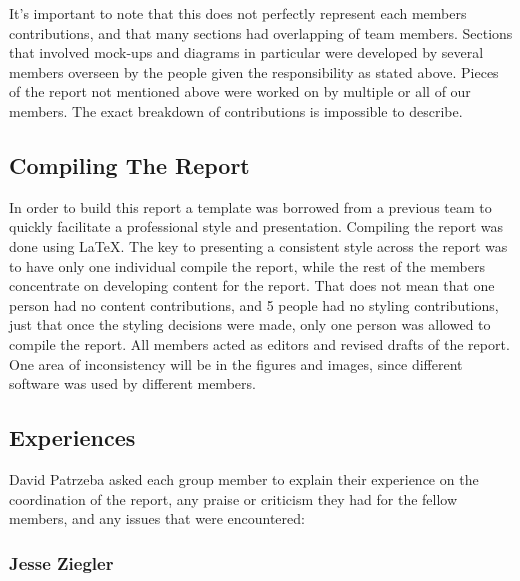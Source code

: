 It's important to note that this does not perfectly represent each members
contributions, and that many sections had overlapping of team members. Sections
that involved mock-ups and diagrams in particular were developed by several
members overseen by the people given the responsibility as stated above.
Pieces of the report not mentioned above were worked on by multiple or all of
our members. The exact breakdown of contributions is impossible to describe. \\

\subsection{Compiling The Report}
In order to build this report a template was borrowed from a previous team to
quickly facilitate a professional style and presentation.  Compiling the report
was done using \LaTeX.  The key to presenting a consistent style across the
report was to have only one individual compile the report, while the rest of
the members concentrate on developing content for the report.  That does not
mean that one person had no content contributions, and 5 people had no styling
contributions, just that once the styling decisions were made, only one person
was allowed to compile the report.  All members acted as editors and revised
drafts of the report.  One area of inconsistency will be in the figures and
images, since different software was used by different members.

\subsection{Experiences}
 David Patrzeba asked each group member to explain their experience on the
 coordination of the report, any praise or criticism they had for the fellow
 members, and any issues that were encountered:

\subsubsection{Jesse Ziegler}

